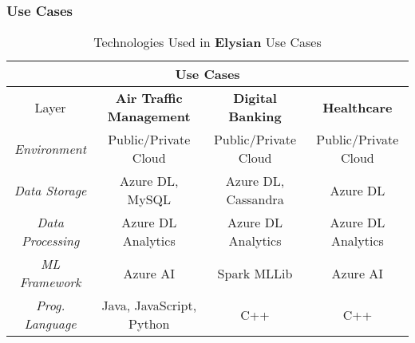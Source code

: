 \documentclass[a4paper,11pt]{article}
\newcommand{\project}[1]{\textbf{#1}\xspace}
\newcommand{\SECURITY}{\project{Elysian}}
\newcommand{\TheProject}{\SECURITY}
\begin{document}
\pagebreak

\subsubsection{Use Cases}
\label{sect:applications}
\label{sect:background-last}

\begin{table}[!htb]
\begin{center}
\begin{tabular}{|c||c|c|c|}
\hline \hline
\multicolumn{4}{|c|}{Use Cases} \\ \hline
Layer & \textbf{Air Traffic Management} & \textbf{Digital Banking} & \textbf{Healthcare} \\
\hline \hline
\emph{Environment} & Public/Private Cloud & Public/Private Cloud & Public/Private Cloud  \\
\emph{Data Storage} & Azure DL, MySQL & Azure DL, Cassandra & Azure DL  \\
\emph{Data Processing} & Azure DL Analytics & Azure DL Analytics & Azure DL Analytics  \\
\emph{ML Framework} & Azure AI & Spark MLLib & Azure AI  \\
\emph{Prog. Language} & Java, JavaScript, Python & C++ & C++ \\
\hline \hline
\end{tabular}
\caption{Technologies Used in \TheProject{} Use Cases}
\label{tab:usecases}
\end{center}
\end{table}
\end{document}
